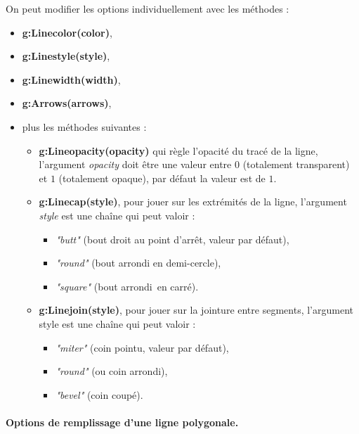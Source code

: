 On peut modifier les options individuellement avec les méthodes : 
\begin{itemize}
    \item \textbf{g:Linecolor(color)}, 
    \item \textbf{g:Linestyle(style)}, 
    \item \textbf{g:Linewidth(width)}, 
    \item \textbf{g:Arrows(arrows)}, 
    \item plus les méthodes suivantes : 
        \begin{itemize}
            \item \textbf{g:Lineopacity(opacity)} qui règle l'opacité du tracé de la ligne, l'argument \emph{opacity} doit être une
valeur entre $0$ (totalement transparent) et $1$ (totalement opaque), par défaut la valeur est de $1$.
            \item \textbf{g:Linecap(style)}, pour jouer sur les extrémités de la ligne, l'argument \emph{style} est une chaîne qui peut valoir :
            \begin{itemize}
                \item \emph{"butt"} (bout droit au point d'arrêt, valeur par défaut),
                \item \emph{"round"} (bout arrondi en demi-cercle),
                \item \emph{"square"} (bout \og arrondi\fg\ en carré).
            \end{itemize}
          
          \item \textbf{g:Linejoin(style)}, pour jouer sur la jointure entre segments, l'argument style est une chaîne qui peut valoir :
            \begin{itemize}
                \item \emph{"miter"} (coin pointu, valeur par défaut),
                \item \emph{"round"} (ou coin arrondi),
                \item \emph{"bevel"} (coin coupé).
            \end{itemize}
        \end{itemize}
\end{itemize}


\paragraph{Options de remplissage d'une ligne polygonale.}

